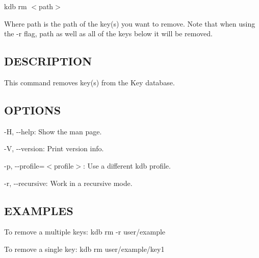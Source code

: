 {\ttfamily kdb rm $<$path$>$}

Where {\ttfamily path} is the path of the key(s) you want to remove. Note that when using the {\ttfamily -\/r} flag, {\ttfamily path} as well as all of the keys below it will be removed.

\subsection*{D\+E\+S\+C\+R\+I\+P\+T\+I\+O\+N}

This command removes key(s) from the Key database.

\subsection*{O\+P\+T\+I\+O\+N\+S}


\begin{DoxyItemize}
\item {\ttfamily -\/\+H}, {\ttfamily -\/-\/help}\+: Show the man page.
\item {\ttfamily -\/\+V}, {\ttfamily -\/-\/version}\+: Print version info.
\item {\ttfamily -\/p}, {\ttfamily -\/-\/profile}=$<$profile$>$\+: Use a different kdb profile.
\item {\ttfamily -\/r}, {\ttfamily -\/-\/recursive}\+: Work in a recursive mode.
\end{DoxyItemize}

\subsection*{E\+X\+A\+M\+P\+L\+E\+S}

To remove a multiple keys\+: {\ttfamily kdb rm -\/r user/example}

To remove a single key\+: {\ttfamily kdb rm user/example/key1} 